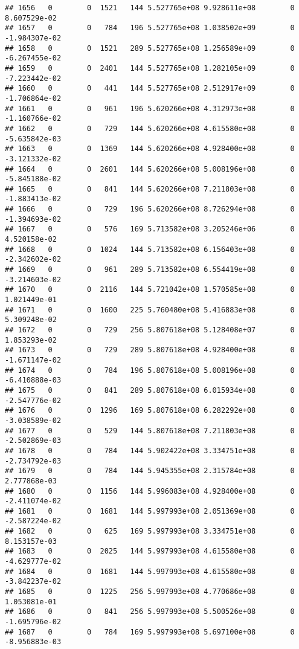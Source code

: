 \documentclass[
]{article}
\begin{document}
\begin{enumerate}
\begin{verbatim}
## 1656   0        0  1521   144 5.527765e+08 9.928611e+08        0  8.607529e-02
## 1657   0        0   784   196 5.527765e+08 1.038502e+09        0 -1.984307e-02
## 1658   0        0  1521   289 5.527765e+08 1.256589e+09        0 -6.267455e-02
## 1659   0        0  2401   144 5.527765e+08 1.282105e+09        0 -7.223442e-02
## 1660   0        0   441   144 5.527765e+08 2.512917e+09        0 -1.706864e-02
## 1661   0        0   961   196 5.620266e+08 4.312973e+08        0 -1.160766e-02
## 1662   0        0   729   144 5.620266e+08 4.615580e+08        0 -5.635842e-03
## 1663   0        0  1369   144 5.620266e+08 4.928400e+08        0 -3.121332e-02
## 1664   0        0  2601   144 5.620266e+08 5.008196e+08        0 -5.845188e-02
## 1665   0        0   841   144 5.620266e+08 7.211803e+08        0 -1.883413e-02
## 1666   0        0   729   196 5.620266e+08 8.726294e+08        0 -1.394693e-02
## 1667   0        0   576   169 5.713582e+08 3.205246e+06        0  4.520158e-02
## 1668   0        0  1024   144 5.713582e+08 6.156403e+08        0 -2.342602e-02
## 1669   0        0   961   289 5.713582e+08 6.554419e+08        0 -3.214603e-02
## 1670   0        0  2116   144 5.721042e+08 1.570585e+08        0  1.021449e-01
## 1671   0        0  1600   225 5.760480e+08 5.416883e+08        0  5.309248e-02
## 1672   0        0   729   256 5.807618e+08 5.128408e+07        0  1.853293e-02
## 1673   0        0   729   289 5.807618e+08 4.928400e+08        0 -1.671147e-02
## 1674   0        0   784   196 5.807618e+08 5.008196e+08        0 -6.410888e-03
## 1675   0        0   841   289 5.807618e+08 6.015934e+08        0 -2.547776e-02
## 1676   0        0  1296   169 5.807618e+08 6.282292e+08        0 -3.038589e-02
## 1677   0        0   529   144 5.807618e+08 7.211803e+08        0 -2.502869e-03
## 1678   0        0   784   144 5.902422e+08 3.334751e+08        0 -2.734792e-03
## 1679   0        0   784   144 5.945355e+08 2.315784e+08        0  2.777868e-03
## 1680   0        0  1156   144 5.996083e+08 4.928400e+08        0 -2.411074e-02
## 1681   0        0  1681   144 5.997993e+08 2.051369e+08        0 -2.587224e-02
## 1682   0        0   625   169 5.997993e+08 3.334751e+08        0  8.153157e-03
## 1683   0        0  2025   144 5.997993e+08 4.615580e+08        0 -4.629777e-02
## 1684   0        0  1681   144 5.997993e+08 4.615580e+08        0 -3.842237e-02
## 1685   0        0  1225   256 5.997993e+08 4.770686e+08        0  1.053081e-01
## 1686   0        0   841   256 5.997993e+08 5.500526e+08        0 -1.695796e-02
## 1687   0        0   784   169 5.997993e+08 5.697100e+08        0 -8.956883e-03

\end{verbatim}
\end{enumerate}
\end{document}
